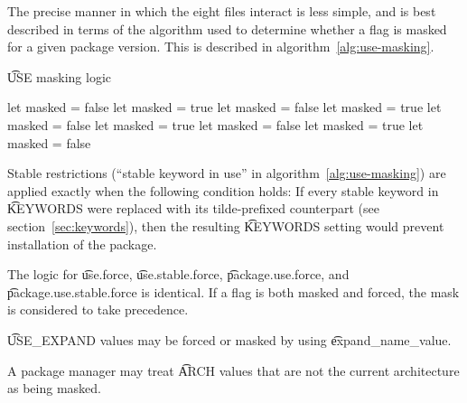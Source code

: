 The precise manner in which the eight files interact is less simple, and is best described in terms
of the algorithm used to determine whether a flag is masked for a given package version. This is
described in algorithm~\ref{alg:use-masking}.
\begin{algorithm}
\caption{\t{USE} masking logic} \label{alg:use-masking}
\begin{algorithmic}[1]
\STATE let masked = false
        \STATE let masked = true
        \STATE let masked = false
    \ENDIF
            \STATE let masked = true
            \STATE let masked = false
        \ENDIF
    \ENDIF
            \STATE let masked = true
            \STATE let masked = false
        \ENDIF
    \ENDFOR
                \STATE let masked = true
                \STATE let masked = false
            \ENDIF
        \ENDFOR
    \ENDIF
\ENDFOR
\end{algorithmic}
\end{algorithm}

Stable restrictions (``stable keyword in use'' in algorithm~\ref{alg:use-masking}) are applied
exactly when the following condition holds: If every stable keyword in \t{KEYWORDS} were replaced
with its tilde-prefixed counterpart (see section~\ref{sec:keywords}), then the resulting
\t{KEYWORDS} setting would prevent installation of the package.

The logic for \t{use.force}, \t{use.stable.force}, \t{package.use.force}, and
\t{package.use.\allowbreak stable.force} is identical. If a flag is both masked and forced, the
mask is considered to take precedence.

\t{USE_EXPAND} values may be forced or masked by using \t{expand_name_value}.

A package manager may treat \t{ARCH} values that are not the current architecture as being masked.





